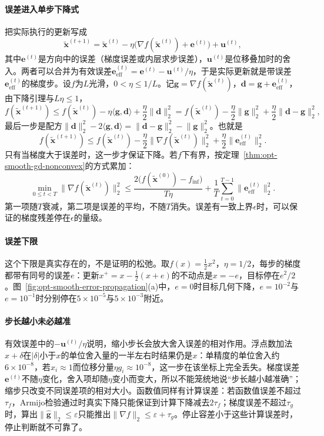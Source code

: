 \paragraph{误差进入单步下降式}
把实际执行的更新写成
\[
  \tilde{\bm x}^{(t+1)}=\tilde{\bm x}^{(t)}-\eta\bigl(\nabla f(\tilde{\bm x}^{(t)})+\bm e^{(t)}\bigr)+\bm u^{(t)},
\]
其中$\bm e^{(t)}$是方向中的误差（梯度误差或内层求步误差），$\bm u^{(t)}$是位移叠加时的舍入。两者可以合并为有效误差$\bm e_{\mathrm{eff}}^{(t)}=\bm e^{(t)}-\bm u^{(t)}/\eta$，于是实际更新就是带误差$\bm e_{\mathrm{eff}}^{(t)}$的梯度步。设$f$为$L$光滑，$0<\eta\leq1/L$。记$\bm g=\nabla f(\tilde{\bm x}^{(t)})$，$\bm d=\bm g+\bm e_{\mathrm{eff}}^{(t)}$，由下降引理与$L\eta\leq1$，
\[
  f(\tilde{\bm x}^{(t+1)})\leq f(\tilde{\bm x}^{(t)})-\eta\langle\bm g,\bm d\rangle+\frac\eta2\lVert\bm d\rVert_2^2
  =f(\tilde{\bm x}^{(t)})-\frac\eta2\lVert\bm g\rVert_2^2+\frac\eta2\lVert\bm d-\bm g\rVert_2^2,
\]
最后一步是配方$\lVert\bm d\rVert_2^2-2\langle\bm g,\bm d\rangle=\lVert\bm d-\bm g\rVert_2^2-\lVert\bm g\rVert_2^2$。也就是
\begin{equation}
\label{eq:opt-smooth-inexact-step}
  f(\tilde{\bm x}^{(t+1)})\leq f(\tilde{\bm x}^{(t)})-\frac\eta2\lVert\nabla f(\tilde{\bm x}^{(t)})\rVert_2^2+\frac\eta2\lVert\bm e_{\mathrm{eff}}^{(t)}\rVert_2^2 .
\end{equation}
只有当梯度大于误差时，这一步才保证下降。若$f$下有界，按定理~\ref{thm:opt-smooth-gd-nonconvex}的方式累加：
\[
  \min_{0\leq t<T}\lVert\nabla f(\tilde{\bm x}^{(t)})\rVert_2^2\leq\frac{2\bigl(f(\tilde{\bm x}^{(0)})-f_{\inf}\bigr)}{T\eta}+\frac1T\sum_{t=0}^{T-1}\lVert\bm e_{\mathrm{eff}}^{(t)}\rVert_2^2 .
\]
第一项随$T$衰减，第二项是误差的平均，不随$T$消失。误差有一致上界$\epsilon$时，可以保证的梯度残差停在$\epsilon$的量级。

\paragraph{误差下限}
这个下限是真实存在的，不是证明的松弛。取$f(x)=\tfrac12x^2$，$\eta=1/2$，每步的梯度都带有同号的误差$e$：更新$x^+=x-\tfrac12(x+e)$的不动点是$x=-e$，目标停在$e^2/2$。图~\ref{fig:opt-smooth-error-propagation}(a)中，$e=0$时目标几何下降，$e=10^{-2}$与$e=10^{-1}$时分别停在$5\times10^{-5}$与$5\times10^{-3}$附近。

\paragraph{步长越小未必越准}
有效误差中的$-\bm u^{(t)}/\eta$说明，缩小步长会放大舍入误差的相对作用。浮点数加法$x+\delta$在$|\delta|$小于$x$的单位舍入量的一半左右时结果仍是$x$：单精度的单位舍入约$6\times10^{-8}$，若$x_i\approx1$而位移分量$\eta g_i\approx10^{-8}$，这一步在该坐标上完全丢失。梯度误差$\bm e^{(t)}$不随$\eta$变化，舍入项却随$\eta$变小而变大，所以不能笼统地说“步长越小越准确”；缩步只改变不同误差项的相对大小。函数值同样有计算误差：若函数值误差不超过$\tau_f$，Armijo检验通过时真实下降只能保证到计算下降减去$2\tau_f$；梯度误差不超过$\tau_g$时，算出$\lVert\hat{\bm g}\rVert_2\leq\varepsilon$只能推出$\lVert\nabla f\rVert_2\leq\varepsilon+\tau_g$。停止容差小于这些计算误差时，停止判断就不可靠了。

